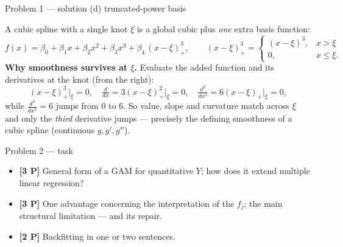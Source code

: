 \documentclass[aspectratio=169,11pt]{beamer}
\begin{document}
\begin{frame}{Problem 1 --- solution (d) truncated-power basis}
  \begin{solutionbox}
    A cubic spline with a single knot $\xi$ is a global cubic plus \emph{one} extra basis
    function:
    \[
      f(x)=\beta_0+\beta_1x+\beta_2x^2+\beta_3x^3+\beta_4\,(x-\xi)^3_+,
      \qquad
      (x-\xi)^3_+=\begin{cases}(x-\xi)^3, & x>\xi\\[0.5mm] 0, & x\le\xi.\end{cases}
    \]
    \textbf{Why smoothness survives at $\xi$.} Evaluate the added function and its derivatives at
    the knot (from the right):
    \[
      (x-\xi)^3_+\big|_{\xi}=0,\quad
      \tfrac{d}{dx}=3(x-\xi)^2_+\big|_{\xi}=0,\quad
      \tfrac{d^2}{dx^2}=6(x-\xi)_+\big|_{\xi}=0,
    \]
    while $\tfrac{d^3}{dx^3}=6$ jumps from $0$ to $6$. So value, slope and curvature match across
    $\xi$ and only the \emph{third} derivative jumps --- precisely the defining smoothness of a
    cubic spline (continuous $g,g',g''$).
  \end{solutionbox}
\end{frame}

\begin{frame}{Problem 2 --- task}
  \begin{exercise}
    \begin{itemize}
      \item[(a)] \textbf{[3 P]} General form of a GAM for quantitative $Y$; how does it extend
        multiple linear regression?
      \item[(b)] \textbf{[3 P]} One advantage concerning the interpretation of the $f_j$;
        the main structural limitation --- and its repair.
      \item[(c)] \textbf{[2 P]} Backfitting in one or two sentences.
    \end{itemize}
  \end{exercise}
  \vspace{2pt}{\scriptsize\itshape Lecture slides: Chapter 7 --- Moving Beyond Linearity (Lecture 9).}
\end{frame}
\end{document}
